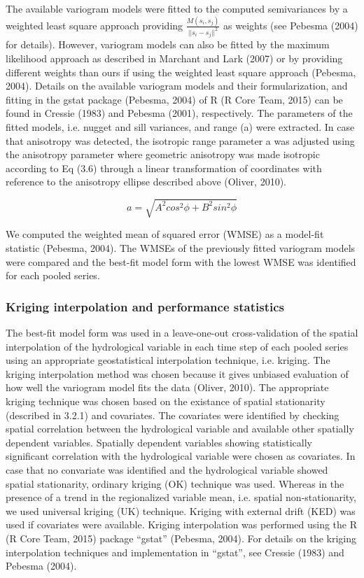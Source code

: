 The available variogram models were fitted to the computed semivariances by a weighted least square approach providing $\frac{M(s_i,s_j)}{||s_i-s_j||^2}$ as weights (see Pebesma (2004) for details). However, variogram models can also be fitted by the maximum likelihood approach as described in Marchant and Lark (2007) or by providing different weights than ours if using the weighted least square approach (Pebesma, 2004). Details on the available variogram models and their formularization, and fitting in the gstat package (Pebesma, 2004) of R (R Core Team, 2015) can be found in Cressie (1983) and Pebesma (2001), respectively. The parameters of the fitted models, i.e. nugget and sill variances, and range (a) were extracted. In case that anisotropy was detected, the isotropic range parameter a was adjusted using the anisotropy parameter where geometric anisotropy was made isotropic according to Eq (3.6) through a linear transformation of coordinates with reference to the anisotropy ellipse described above (Oliver, 2010).

\begin{equation}
a=\sqrt{A^2cos^2\phi+B^2sin^2\phi}
\end{equation}

We computed the weighted mean of squared error (WMSE) as a model-fit statistic (Pebesma, 2004). The WMSEs of the previously fitted variogram models were compared and the best-fit model form with the lowest WMSE was identified for each pooled series.

\subsubsection{Kriging interpolation and performance statistics}
\label{Kriging interpolation and performance statistics}

The best-fit model form was used in a leave-one-out cross-validation of the spatial interpolation of the hydrological variable in each time step of each pooled series using an appropriate geostatistical interpolation technique, i.e. kriging. The kriging interpolation method was chosen because it gives unbiased evaluation of how well the variogram model fits the data (Oliver, 2010). The appropriate kriging technique was chosen based on the existance of spatial stationarity (described in 3.2.1) and covariates. The covariates were identified by checking spatial correlation between the hydrological variable and available other spatially dependent variables. Spatially dependent variables showing statistically significant correlation with the hydrological variable were chosen as covariates. In case that no convariate was identified and the hydrological variable showed spatial stationarity, ordinary kriging (OK) technique was used. Whereas in the presence of a trend in the regionalized variable mean, i.e. spatial non-stationarity, we used universal kriging (UK) technique. Kriging with external drift (KED) was used if covariates were available. Kriging interpolation was performed using the R (R Core Team, 2015) package “gstat” (Pebesma, 2004). For details on the kriging interpolation techniques and implementation in “gstat”, see Cressie (1983) and Pebesma (2004).

